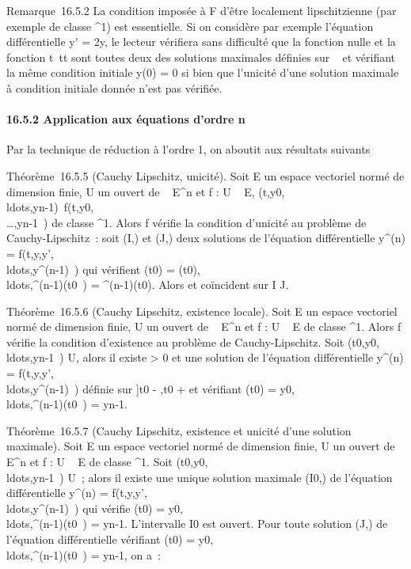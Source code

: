 Remarque~16.5.2 La condition imposée à F d'être localement
lipschitzienne (par exemple de classe ^1) est essentielle.
Si on considère par exemple l'équation différentielle y' =
2\sqrt\textbar{}y\textbar{}, le lecteur vérifiera
sans difficulté que la fonction nulle et la fonction
t\mapsto~t\textbar{}t\textbar{} sont toutes deux des
solutions maximales définies sur ~ et vérifiant la même condition
initiale y(0) = 0 si bien que l'unicité d'une solution maximale à
condition initiale donnée n'est pas vérifiée.

\paragraph{16.5.2 Application aux équations d'ordre n}

Par la technique de réduction à l'ordre 1, on aboutit aux résultats
suivants

Théorème~16.5.5 (Cauchy Lipschitz, unicité). Soit E un espace vectoriel
normé de dimension finie, U un ouvert de ~ \times E^n et f : U \rightarrow~
E,
(t,y0,\\ldots,yn-1)\mapsto~f(t,y0,\\\ldots,yn-1~)
de classe ^1. Alors f vérifie la condition d'unicité au
problème de Cauchy-Lipschitz~: soit (I,\phi) et (J,\psi) deux solutions de
l'équation différentielle y^(n) =
f(t,y,y',\\ldots,y^(n-1)~)
qui vérifient \phi(t0) =
\psi(t0),\\ldots,\phi^(n-1)(t0~)
= \psi^(n-1)(t0). Alors \phi et \psi coïncident sur I \bigcap J.

Théorème~16.5.6 (Cauchy Lipschitz, existence locale). Soit E un espace
vectoriel normé de dimension finie, U un ouvert de ~ \times E^n et
f : U \rightarrow~ E de classe ^1. Alors f vérifie la condition
d'existence au problème de Cauchy-Lipschitz. Soit
(t0,y0,\\ldots,yn-1~)
\in U, alors il existe \eta \textgreater{} 0 et une solution \phi de l'équation
différentielle y^(n) =
f(t,y,y',\\ldots,y^(n-1)~)
définie sur {]}t0 - \eta,t0 + \eta{[} et vérifiant
\phi(t0) =
y0,\\ldots,\phi^(n-1)(t0~)
= yn-1.

Théorème~16.5.7 (Cauchy Lipschitz, existence et unicité d'une solution
maximale). Soit E un espace vectoriel normé de dimension finie, U un
ouvert de ~ \times E^n et f : U \rightarrow~ E de classe ^1. Soit
(t0,y0,\\ldots,yn-1~)
\in U~; alors il existe une unique solution maximale
(I0,) de l'équation différentielle
y^(n) =
f(t,y,y',\\ldots,y^(n-1)~)
qui vérifie \phi(t0) =
y0,\\ldots,\phi^(n-1)(t0~)
= yn-1. L'intervalle I0 est ouvert. Pour toute
solution (J,\psi) de l'équation différentielle vérifiant \psi(t0) =
y0,\\ldots,\psi^(n-1)(t0~)
= yn-1, on a~:

